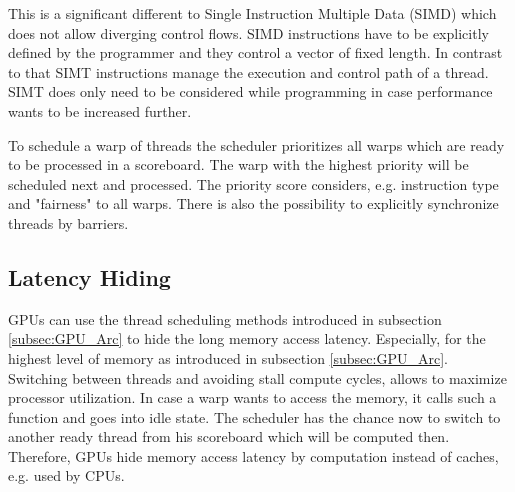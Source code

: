 \documentclass[a4paper,12pt]{llncs}
\numberwithin{equation}{section}
\begin{document}
  This is a significant different to Single Instruction Multiple Data (SIMD) which does not allow diverging control flows.
  SIMD instructions have to be explicitly defined by the programmer and they control a vector of fixed length.
  In contrast to that SIMT instructions manage the execution and control path of a thread.
  SIMT does only need to be considered while programming in case performance wants to be increased further.
  
  To schedule a warp of threads the scheduler prioritizes all warps which are ready to be processed in a scoreboard.
  The warp with the highest priority will be scheduled next and processed.
  The priority score considers, e.g. instruction type and "fairness" to all warps.
  There is also the possibility to explicitly synchronize threads by barriers.~\cite{Lindholm.2008}

         
\subsection{Latency Hiding}
  GPUs can use the thread scheduling methods introduced in subsection \ref{subsec:GPU_Arc} to hide the long memory access latency.
  Especially, for the highest level of memory as introduced in subsection \ref{subsec:GPU_Arc}.
  Switching between threads and avoiding stall compute cycles, allows to maximize processor utilization.
  In case a warp wants to access the memory, it calls such a function and goes into idle state.
  The scheduler has the chance now to switch to another ready thread from his scoreboard which will be computed then.
  Therefore, GPUs hide memory access latency by computation instead of caches, e.g. used by CPUs.~\cite{volkov.2016}~\cite{Rauber.2012}~\cite{NVIDIA.2019}
  
  
\end{document}
